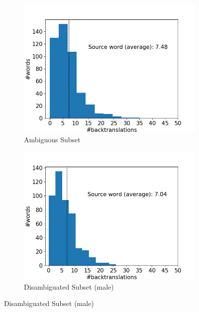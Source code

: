 \begin{figure}[!htb]
     \centering
     
     \begin{subfigure}{0.49\textwidth}
         \centering
         \includegraphics[width=\textwidth]{figures/alignment/word_backtranslations_original.png}
         \caption{Ambiguous Subset}
         \label{fig:alignment_backtranslation_ambiguous}
     \end{subfigure}
     \hfill
     \begin{subfigure}{0.49\textwidth}
         \centering
         \includegraphics[width=\textwidth]{figures/alignment/word_backtranslations_male.png}
         \caption{Disambiguated Subset (male)}

\end{subfigure}
\end{figure}
